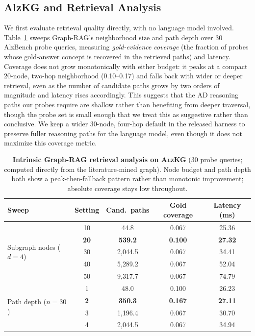 \documentclass{article}
\begin{document}
\subsection{AlzKG and Retrieval Analysis}
\label{sec:retrieval-analysis}
We first evaluate retrieval quality directly, with no language model involved. Table~\ref{tab:ablation} sweeps Graph-RAG's neighborhood size and path depth over 30 AlzBench probe queries, measuring \emph{gold-evidence coverage} (the fraction of probes whose gold-answer concept is recovered in the retrieved paths) and latency. Coverage does not grow monotonically with either budget: it peaks at a compact 20-node, two-hop neighborhood (0.10--0.17) and falls back with wider or deeper retrieval, even as the number of candidate paths grows by two orders of magnitude and latency rises accordingly. This suggests that the AD reasoning paths our probes require are shallow rather than benefiting from deeper traversal, though the probe set is small enough that we treat this as suggestive rather than conclusive. We keep a wider 30-node, four-hop default in the released harness to preserve fuller reasoning paths for the language model, even though it does not maximize this coverage metric.

\begin{table}[t]
\centering
\caption{\textbf{Intrinsic Graph-RAG retrieval analysis on \textsc{AlzKG}} (30 probe queries; computed directly from the literature-mined graph). Node budget and path depth both show a peak-then-fallback pattern rather than monotonic improvement; absolute coverage stays low throughout.}
\label{tab:ablation}
\small
\begin{tabular}{l c c c c}
\toprule
\textbf{Sweep} & \textbf{Setting} & \textbf{Cand.\ paths} & \textbf{Gold coverage} & \textbf{Latency (ms)} \\
\midrule
\multirow{5}{*}{Subgraph nodes ($d{=}4$)}
 & 10 & 44.8 & 0.067 & 25.36 \\
 & \textbf{20} & \textbf{539.2} & \textbf{0.100} & \textbf{27.32} \\
 & 30 & 2{,}044.5 & 0.067 & 34.41 \\
 & 40 & 5{,}289.2 & 0.067 & 52.04 \\
 & 50 & 9{,}317.7 & 0.067 & 74.79 \\
\midrule
\multirow{4}{*}{Path depth ($n{=}30$)}
 & 1 & 48.0 & 0.100 & 26.23 \\
 & \textbf{2} & \textbf{350.3} & \textbf{0.167} & \textbf{27.11} \\
 & 3 & 1{,}196.4 & 0.067 & 30.70 \\
 & 4 & 2{,}044.5 & 0.067 & 34.94 \\
\bottomrule
\end{tabular}
\end{table}
\end{document}
